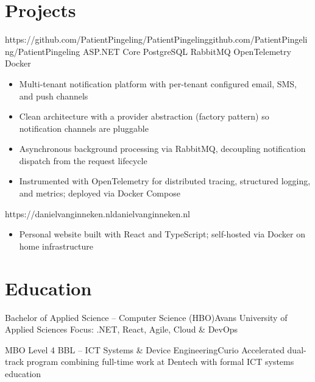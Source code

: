 \documentclass[a4paper,10pt]{article}
\begin{document}
\section{Projects}

\begin{cvgrid}
          {https://github.com/PatientPingeling/PatientPingeling}{github.com/PatientPingeling/PatientPingeling}
          {ASP.NET Core \middot PostgreSQL \middot RabbitMQ \middot OpenTelemetry \middot Docker}
\begin{itemize}
  \item Multi-tenant notification platform with per-tenant configured email, SMS, and push channels
  \item Clean architecture with a provider abstraction (factory pattern) so notification channels are pluggable
  \item Asynchronous background processing via RabbitMQ, decoupling notification dispatch from the request lifecycle
  \item Instrumented with OpenTelemetry for distributed tracing, structured logging, and metrics; deployed via Docker Compose
\end{itemize}

          {https://danielvanginneken.nl}{danielvanginneken.nl}
          {}
\begin{itemize}
  \item Personal website built with React and TypeScript; self-hosted via Docker on home infrastructure
\end{itemize}
\end{cvgrid}

\section{Education}

\begin{cvgrid}
        {Bachelor of Applied Science -- Computer Science (HBO)}{Avans University of Applied Sciences}
{\small\color{muted}Focus: .NET, React, Agile, Cloud \& DevOps}

        {MBO Level 4 BBL -- ICT Systems \& Device Engineering}{Curio}
{\small\color{muted}Accelerated dual-track program combining full-time work at Dentech with formal ICT systems education}
\end{cvgrid}
\end{document}

